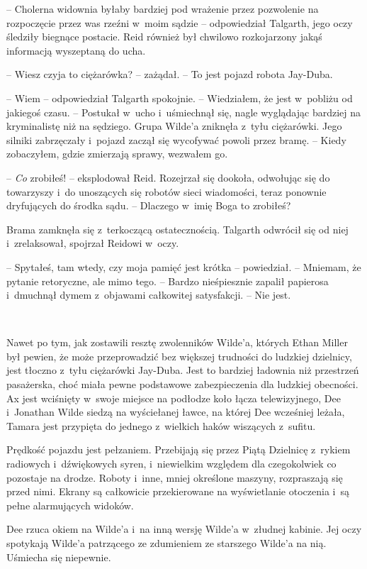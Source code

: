 \documentclass[oneside,polish,11pt,sfheadings]{mwbk}
\begin{document}
-- Cholerna widownia byłaby bardziej pod wrażenie przez pozwolenie na
rozpoczęcie przez was rzeźni w~moim sądzie -- odpowiedział Talgarth, jego
oczy śledziły biegnące postacie. Reid również był chwilowo rozkojarzony
jakąś informacją wyszeptaną do ucha.

-- Wiesz czyja to ciężarówka? -- zażądał. -- To jest pojazd robota
Jay-Duba.

-- Wiem -- odpowiedział Talgarth spokojnie. -- Wiedziałem, że jest w~pobliżu od jakiegoś czasu. -- Postukał w~ucho i~uśmiechnął się, nagle
wyglądając bardziej na kryminalistę niż na sędziego. Grupa Wilde'a
zniknęła z~tyłu ciężarówki. Jego silniki zabrzęczały i~pojazd zaczął się
wycofywać powoli przez bramę. -- Kiedy zobaczyłem, gdzie zmierzają
sprawy, wezwałem go.

-- \emph{Co} zrobiłeś! -- eksplodował Reid. Rozejrzał się dookoła,
odwołując się do towarzyszy i~do unoszących się robotów sieci
wiadomości, teraz ponownie dryfujących do środka sądu. -- Dlaczego w~imię
Boga to zrobiłeś?

Brama zamknęła się z~terkoczącą ostatecznością. Talgarth odwrócił się od
niej i~zrelaksował, spojrzał Reidowi w~oczy.

-- Spytałeś, tam wtedy, czy moja pamięć jest krótka -- powiedział. -- Mniemam, że pytanie retoryczne, ale mimo tego. -- Bardzo nieśpiesznie
zapalił papierosa i~dmuchnął dymem z~objawami całkowitej satysfakcji. -- Nie jest.

~

Nawet po tym, jak zostawili resztę zwolenników Wilde'a, których Ethan
Miller był pewien, że może przeprowadzić bez większej trudności do
ludzkiej dzielnicy, jest tłoczno z~tyłu ciężarówki Jay-Duba. Jest to
bardziej ładownia niż przestrzeń pasażerska, choć miała pewne podstawowe
zabezpieczenia dla ludzkiej obecności. Ax jest wciśnięty w~swoje miejsce
na podłodze koło łącza telewizyjnego, Dee i~Jonathan Wilde siedzą na
wyściełanej ławce, na której Dee wcześniej leżała, Tamara jest przypięta
do jednego z~wielkich haków wiszących z~sufitu.

Prędkość pojazdu jest pełzaniem. Przebijają się przez Piątą Dzielnicę z~rykiem radiowych i~dźwiękowych syren, i~niewielkim względem dla
czegokolwiek co pozostaje na drodze. Roboty i~inne, mniej określone
maszyny, rozpraszają się przed nimi. Ekrany są całkowicie przekierowane
na wyświetlanie otoczenia i~są pełne alarmujących widoków.

Dee rzuca okiem na Wilde'a i~na inną wersję Wilde'a w~złudnej kabinie.
Jej oczy spotykają Wilde'a patrzącego ze zdumieniem ze starszego Wilde'a
na nią. Uśmiecha się niepewnie.
\end{document}
